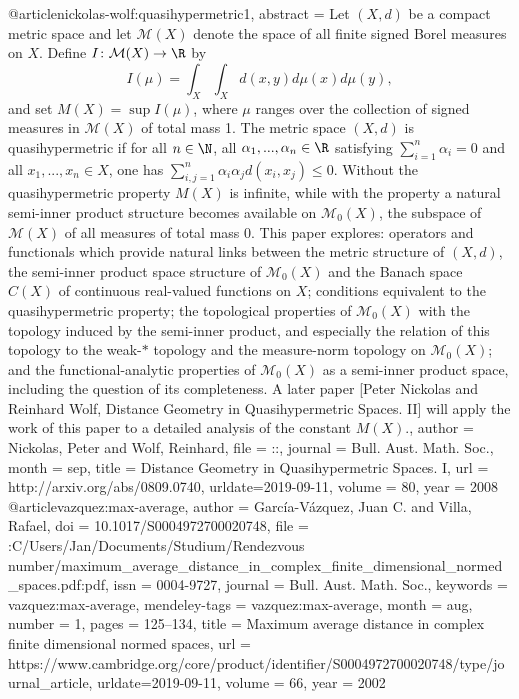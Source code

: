 @article{nickolas-wolf:quasihypermetric1,
abstract = {Let $(X, d)$ be a compact metric space and let $\mathcal{M}(X)$ denote the space of all finite signed Borel measures on $X$. Define $I \colon \mathcal{M}(X) \to \R$ by \[I(\mu) = \int_X \int_X d(x,y) d\mu(x) d\mu(y),\] and set $M(X) = \sup I(\mu)$, where $\mu$ ranges over the collection of signed measures in $\mathcal{M}(X)$ of total mass 1. The metric space $(X, d)$ is quasihypermetric if for all $n \in \N$, all $\alpha_1, ..., \alpha_n \in \R$ satisfying $\sum_{i=1}^n \alpha_i = 0$ and all $x_1, ..., x_n \in X$, one has $\sum_{i,j=1}^n \alpha_i \alpha_j d(x_i, x_j) \leq 0$. Without the quasihypermetric property $M(X)$ is infinite, while with the property a natural semi-inner product structure becomes available on $\mathcal{M}_0(X)$, the subspace of $\mathcal{M}(X)$ of all measures of total mass 0. This paper explores: operators and functionals which provide natural links between the metric structure of $(X, d)$, the semi-inner product space structure of $\mathcal{M}_0(X)$ and the Banach space $C(X)$ of continuous real-valued functions on $X$; conditions equivalent to the quasihypermetric property; the topological properties of $\mathcal{M}_0(X)$ with the topology induced by the semi-inner product, and especially the relation of this topology to the weak-$*$ topology and the measure-norm topology on $\mathcal{M}_0(X)$; and the functional-analytic properties of $\mathcal{M}_0(X)$ as a semi-inner product space, including the question of its completeness. A later paper [Peter Nickolas and Reinhard Wolf, Distance Geometry in Quasihypermetric Spaces. II] will apply the work of this paper to a detailed analysis of the constant $M(X)$.},
author = {Nickolas, Peter and Wolf, Reinhard},
file = {::},
journal = {Bull. Aust. Math. Soc.},
month = {sep},
title = {{Distance Geometry in Quasihypermetric Spaces. I}},
url = {http://arxiv.org/abs/0809.0740},
urldate={2019-09-11},
volume = {80},
year = {2008}
}
@article{vazquez:max-average,
author = {Garc{\'{i}}a-V{\'{a}}zquez, Juan C. and Villa, Rafael},
doi = {10.1017/S0004972700020748},
file = {:C\:/Users/Jan/Documents/Studium/Rendezvous number/maximum_average_distance_in_complex_finite_dimensional_normed_spaces.pdf:pdf},
issn = {0004-9727},
journal = {Bull. Aust. Math. Soc.},
keywords = {vazquez:max-average},
mendeley-tags = {vazquez:max-average},
month = {aug},
number = {1},
pages = {125--134},
title = {{Maximum average distance in complex finite dimensional normed spaces}},
url = {https://www.cambridge.org/core/product/identifier/S0004972700020748/type/journal_article},
urldate={2019-09-11},
volume = {66},
year = {2002}
}

